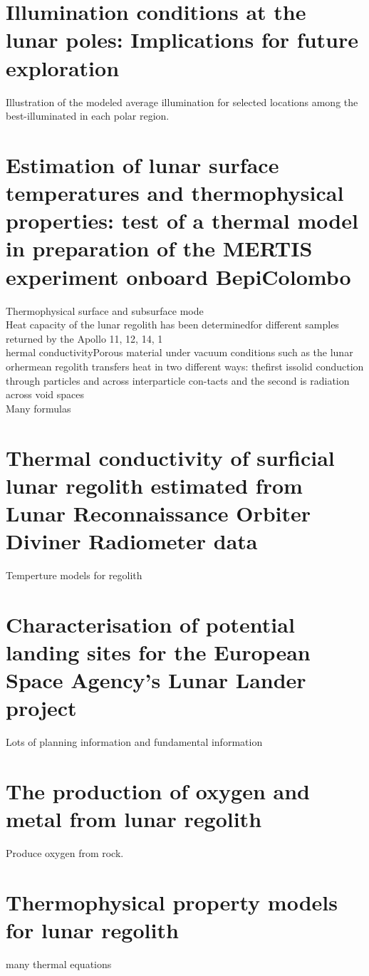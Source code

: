 \documentclass[prl,onecolumn]{revtex4-1}  %
\begin{document}
\section{Illumination conditions at the lunar poles: Implications for future exploration}
Illustration of the modeled average illumination for selected locations among the best-illuminated in each polar region. 
\citep{Glaser}


\section{Estimation of lunar surface temperatures and thermophysical properties: test of a thermal model in preparation of the MERTIS experiment onboard BepiColombo}
Thermophysical surface and subsurface mode\\
Heat capacity of the lunar regolith has been determinedfor different samples returned by the Apollo 11, 12, 14, 1\\
hermal conductivityPorous material under vacuum conditions such as the lunar orhermean regolith transfers heat in two different ways: thefirst issolid conduction through particles and across interparticle con-tacts and the second is radiation across void spaces\\
Many formulas\citep{Bauch}


\section{Thermal conductivity of surficial lunar regolith estimated from Lunar Reconnaissance Orbiter Diviner Radiometer data}
Temperture models for regolith
\citep{Shuoran}

\section{Characterisation of potential landing sites for the European Space Agency's Lunar Lander project}
Lots of planning information and fundamental information
\citep{Rosa}


\section{The production of oxygen and metal from lunar regolith}
Produce oxygen from rock.\citep{Schwandt}


\section{Thermophysical property models for lunar regolith}
many thermal equations\citep{Schreiner}
\end{document}

